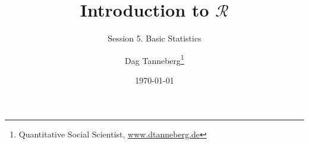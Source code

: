 \usepackage[utf8]{inputenc}
\usepackage{hyperref}
\usepackage{graphicx}
\usepackage{booktabs}

\title{Introduction to $\mathcal{R}$}
\subtitle{Session 5. Basic Statistics}
\author{Dag Tanneberg\thanks{%
    Quantitative Social Scientist,
    \href{http://www.dtanneberg.de}{www.dtanneberg.de}
    }
}
\date{\today}

\hypersetup{colorlinks, urlcolor = red, linkcolor = }
